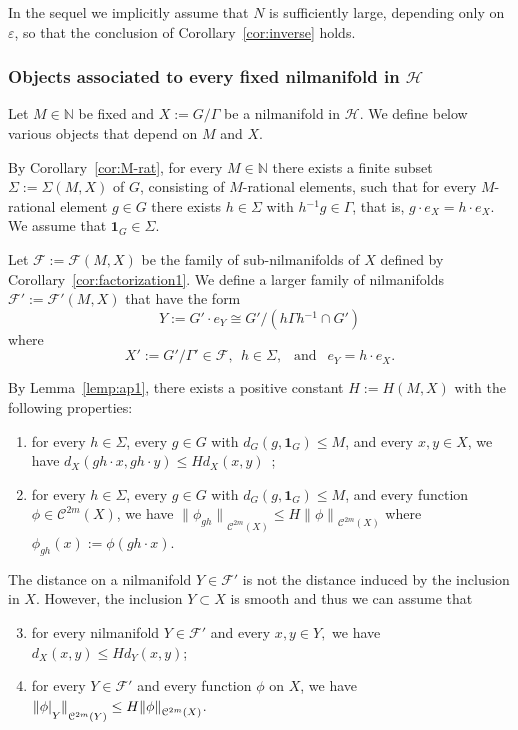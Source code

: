 \documentclass[11pt]{amsart}
\theoremstyle{definition}
\begin{document}
   In the sequel we implicitly assume
  that $N$ is sufficiently large, depending only on ${\varepsilon}$, so that the conclusion of Corollary~\ref{cor:inverse} holds.

\subsubsection{Objects associated to every fixed nilmanifold in ${{\mathcal H}}$}
\label{subsec:new_objects} Let $M\in {{\mathbb N}}$ be fixed and
$X:=G/\Gamma$ be a nilmanifold in ${{\mathcal H}}$. We define below various
objects that depend on $M$ and $X$.

By Corollary~\ref{cor:M-rat}, for every $M\in {{\mathbb N}}$ there exists  a
finite subset $\Sigma:=\Sigma(M,X)$ of $G$, consisting of
$M$-rational elements, such that for every $M$-rational  element
$g\in G$ there exists $h\in \Sigma$ with  $h{^{-1}} g\in\Gamma$, that
is, $g\cdot e_X=h\cdot e_X$. We  assume  that ${\mathbf{1}}_G\in\Sigma$.

Let ${{\mathcal F}}:={{\mathcal F}}(M,X)$ be the family of sub-nilmanifolds of $X$ defined
by Corollary~\ref{cor:factorization1}. We define a larger family of
nilmanifolds ${{\mathcal F}}':={{\mathcal F}}'(M,X)$ that have the form
$$
Y:=G'\cdot e_Y\cong G'/(h\Gamma h{^{-1}}\cap G')
$$
 where
$$
X':=G'/\Gamma'\in{{\mathcal F}},\ \   h\in \Sigma,\ \ \text{ and } \ \
e_Y=h\cdot e_X.
$$

By Lemma~\ref{lemp:ap1}, there exists a positive constant
$H:=H(M,X)$ with the following properties:
\begin{enumerate}
\item
\label{eq:kappa1}  for every $h\in \Sigma$,  every $g\in G$  with
$d_G(g,{\mathbf{1}}_G)\leq M$,  and every  $x,y\in X$, we have  $d_X(gh\cdot
x,gh\cdot y)\leq H d_X(x,y)$\ ;
\item
\label{eq:transCm} {\rule{0mm}{5mm}} for every $h\in \Sigma$,   every $g\in G$
with $d_G(g,{\mathbf{1}}_G)\leq M$,  and every function $\phi\in
{{\mathcal C}}^{2m}(X)$, we have ${\lVert {\phi_{gh}} \rVert}_{{{\mathcal C}}^{2m}(X)}\leq
H{\lVert \phi \rVert}_{{{\mathcal C}}^{2m}(X)}$ where $\phi_{gh}(x):=\phi(gh\cdot x)$.
\end{enumerate}

The distance on a nilmanifold $Y\in {{\mathcal F}}'$ is not the distance
induced by the inclusion in $X$.
 However, the inclusion $Y\subset X$ is smooth and thus we can assume that
\begin{enumerate}
\setcounter{enumi}{2}
\item
\label{eq:LipXXprime} for every nilmanifold $Y\in{{\mathcal F}}'$ and every
$x,y\in Y,$ we have $d_X(x,y)\leq Hd_{Y}(x,y)$;
\item
\label{eq:CmY} {\rule{0mm}{5mm}} for every $Y\in{{\mathcal F}}'$ and every function $\phi$
on $X$, we have ${\lVert {\phi|\raise-2mm\hbox{$\scriptstyle
Y$}} \rVert}_{{{\mathcal C}}^{2m}(Y)}\leq H {\lVert \phi \rVert}_{{{\mathcal C}}^{2m}(X)}$.
\end{enumerate}
\end{document}
